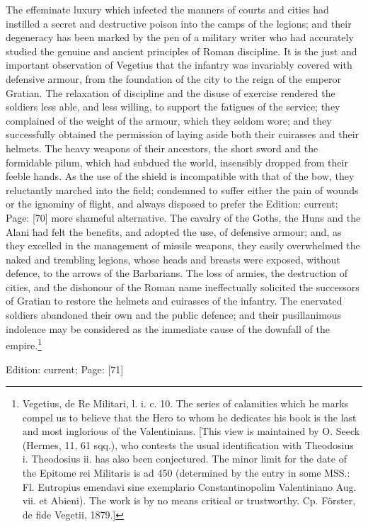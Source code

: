 The effeminate luxury which infected the manners of courts and cities had instilled a secret and destructive poison into the camps of the legions; and their degeneracy has been marked by the pen of a military writer who had accurately studied the genuine and ancient principles of Roman discipline. It is the just and important observation of Vegetius that the infantry was invariably covered with defensive armour, from the foundation of the city to the reign of the emperor Gratian. The relaxation of discipline and the disuse of exercise rendered the soldiers less able, and less willing, to support the fatigues of the service; they complained of the weight of the armour, which they seldom wore; and they successfully obtained the permission of laying aside both their cuirasses and their helmets. The heavy weapons of their ancestors, the short sword and the formidable pilum, which had subdued the world, insensibly dropped from their feeble hands. As the use of the shield is incompatible with that of the bow, they reluctantly marched into the field; condemned to suffer either the pain of wounds or the ignominy of flight, and always disposed to prefer the Edition: current; Page: [70] more shameful alternative. The cavalry of the Goths, the Huns and the Alani had felt the benefits, and adopted the use, of defensive armour; and, as they excelled in the management of missile weapons, they easily overwhelmed the naked and trembling legions, whose heads and breasts were exposed, without defence, to the arrows of the Barbarians. The loss of armies, the destruction of cities, and the dishonour of the Roman name ineffectually solicited the successors of Gratian to restore the helmets and cuirasses of the infantry. The enervated soldiers abandoned their own and the public defence; and their pusillanimous indolence may be considered as the immediate cause of the downfall of the empire.\footnote{Vegetius, de Re Militari, l. i. c. 10. The series of calamities which he marks compel us to believe that the Hero to whom he dedicates his book is the last and most inglorious of the Valentinians. [This view is maintained by O. Seeck (Hermes, 11, 61 sqq.), who contests the usual identification with Theodosius i. Theodosius ii. has also been conjectured. The minor limit for the date of the Epitome rei Militaris is ad 450 (determined by the entry in some MSS.: Fl. Eutropius emendavi sine exemplario Constantinopolim Valentiniano Aug. vii. et Abieni). The work is by no means critical or trustworthy. Cp. Förster, de fide Vegetii, 1879.]}

Edition: current; Page: [71]

